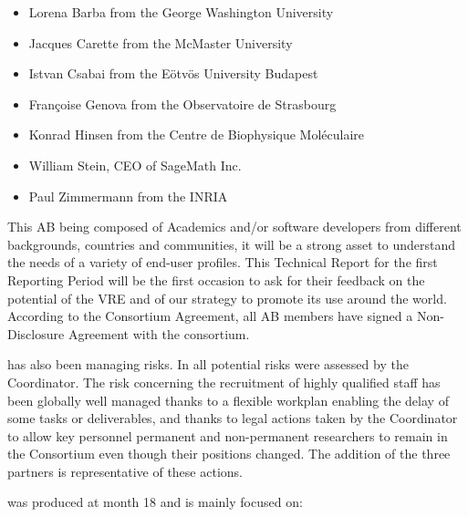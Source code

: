 \documentclass{deliverablereport}
\begin{document}
\begin{itemize}
\item{Lorena Barba from the George Washington University}
\item{Jacques Carette from the McMaster University}
\item{Istvan Csabai from the Eötvös University Budapest}
\item{Françoise Genova from the Observatoire de Strasbourg}
\item{Konrad Hinsen from the Centre de Biophysique Moléculaire}
\item{William Stein, CEO of SageMath Inc.}
\item{Paul Zimmermann from the INRIA}
\end{itemize}

This AB being composed of Academics and/or software developers from different backgrounds, countries and communities, it will be a strong asset to understand the needs of a variety of end-user profiles. This Technical Report for the first Reporting Period will be the first occasion to ask for their feedback on the potential of the VRE and of our strategy to promote its use around the world.
According to the Consortium Agreement, all AB members have signed a Non-Disclosure Agreement with the consortium.

 has also been managing risks. In  all potential risks were assessed by the Coordinator. The risk concerning the recruitment of highly qualified staff has been globally well managed thanks to a flexible workplan enabling the delay of some tasks or deliverables, and thanks to legal actions taken by the Coordinator to allow key personnel permanent and non-permanent researchers to remain in the Consortium even though their positions changed. The addition of the three partners is representative of these actions.



 was produced at month 18 and is mainly focused on: 
\end{document}
